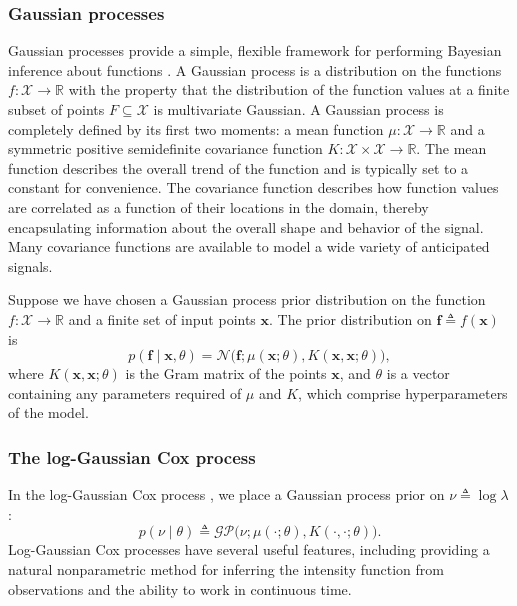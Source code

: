 \documentclass{article}
\newcommand{\deq}{\triangleq}
\newcommand{\cm}[1]{\mathcal{#1}}
\newcommand{\given}{\mid}
\newcommand{\R}{\mathbb{R}}
\begin{document}
\subsubsection{Gaussian processes}

Gaussian processes provide a simple, flexible framework for performing
Bayesian inference about functions \citep{gpml}.  A Gaussian process
is a distribution on the functions $f\colon \cm{X} \to \R$ with the
property that the distribution of the function values at a finite
subset of points $F \subseteq \cm{X}$ is multivariate Gaussian.  A
Gaussian process is completely defined by its first two moments: a
mean function $\mu\colon \cm{X} \to \R$ and a symmetric positive
semidefinite covariance function $K\colon \cm{X} \times \cm{X} \to
\R$.  The mean function describes the overall trend of the function
and is typically set to a constant for convenience.  The covariance
function describes how function values are correlated as a function of
their locations in the domain, thereby encapsulating information about
the overall shape and behavior of the signal.  Many covariance
functions are available to model a wide variety of anticipated
signals.

Suppose we have chosen a Gaussian process prior distribution on the
function $f\colon \cm{X} \to \R$ and a finite set of input points
$\bm{x}$.  The prior distribution on $\bm{f} \deq f(\bm{x})$ is
\begin{equation*}
 p(\bm{f} \given \bm{x}, \theta)
 =
 \cm{N}
 \bigl(
   \bm{f};
   \mu(\bm{x}; \theta),
   K(\bm{x}, \bm{x}; \theta)
 \bigr),
\end{equation*}
where $K(\bm{x}, \bm{x}; \theta)$ is the Gram matrix of the points
$\bm{x}$, and $\theta$ is a vector containing any parameters required
of $\mu$ and $K$, which comprise hyperparameters of the model.

\subsubsection{The log-Gaussian Cox process}

In the log-Gaussian Cox process \citep{moller, diggle}, we place a
Gaussian process prior on $\nu \deq \log \lambda$:
\begin{equation*}
  p(\nu \given \theta) 
  \deq 
  \cm{GP}\bigl(\nu; \mu(\cdot; \theta), K(\cdot, \cdot; \theta)\bigr).
\end{equation*}
Log-Gaussian Cox processes have several useful features, including
providing a natural nonparametric method for inferring the intensity
function from observations and the ability to work in continuous time.
\end{document}
